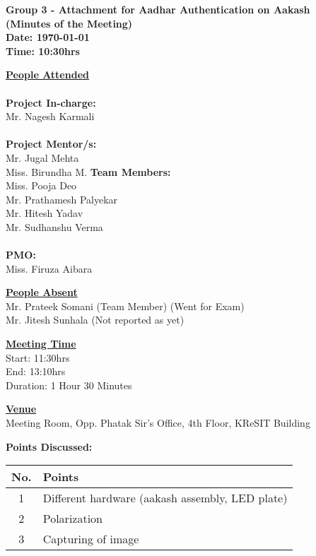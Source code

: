 \documentclass[a4paper,12pt]{article}
\begin{document}
\LARGE
\begin{center}
\textbf
{
Group 3 - Attachment for Aadhar Authentication on Aakash\\
(Minutes of the Meeting) \\ 
Date: \today \\
Time: 10:30hrs
}
\end{center}

\vfill

\large

\underline{\textbf{People Attended}} \\ 
\\
\indent \textbf{Project In-charge:} \\
\indent Mr. Nagesh Karmali \\
\\
\indent \textbf{Project Mentor/s:} \\
\indent Mr. Jugal Mehta \\
\indent Miss. Birundha M.
\vfill
\indent \textbf{Team Members:} \\
\indent Miss. Pooja Deo \\
\indent Mr. Prathamesh Palyekar \\
\indent Mr. Hitesh Yadav \\
\indent Mr. Sudhanshu Verma \\
\\
\indent \textbf{PMO:} \\
\indent Miss. Firuza Aibara\\

\vfill

\underline{\textbf{People Absent}} \\ 
\indent Mr. Prateek Somani (Team Member) (Went for Exam) \\
\indent Mr. Jitesh Sunhala (Not reported as yet)
\vfill

\underline{\textbf{Meeting Time}} \\
\indent Start: 11:30hrs \\
\indent End: 13:10hrs \\
\indent Duration: 1 Hour 30 Minutes \\

\vfill

\underline{\textbf{Venue}} \\
\indent Meeting Room, Opp. Phatak Sir's Office, 4th Floor, KReSIT Building

\pagebreak

\textbf{Points Discussed:}
\vskip10pt
\begin{tabular}{|c|p{13cm}|}
 \hline
 \textbf{No.} & \textbf{Points} \\
  \hline
  \hline
1 & Different hardware (aakash assembly, LED plate) \\
  \hline
2 & Polarization \\
\hline
3 & Capturing of image \\
  \hline
\end{tabular}
\end{document}
